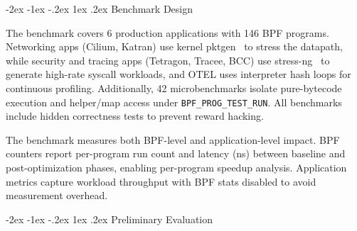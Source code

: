 \documentclass[sigplan,10pt,anonymous,nonacm]{acmart}
\makeatletter
\renewcommand\section{\@startsection{section}{1}{\z@}%
  {-2ex \@plus -1ex \@minus -.2ex}%
  {1ex \@plus .2ex}%
  {\normalfont\Large\bfseries}}
\makeatother
\begin{document}
\section{Benchmark Design}

The benchmark covers 6 production applications with 146 BPF programs.
Networking apps (Cilium, Katran) use kernel pktgen~\cite{pktgen} to stress the datapath, while security and tracing apps (Tetragon, Tracee, BCC) use stress-ng~\cite{stressng} to generate high-rate syscall workloads, and OTEL uses interpreter hash loops for continuous profiling.
Additionally, 42 microbenchmarks isolate pure-bytecode execution and helper/map access under \texttt{BPF\_PROG\_TEST\_RUN}.
All benchmarks include hidden correctness tests to prevent reward hacking.

The benchmark measures both BPF-level and application-level impact.
BPF counters report per-program run count and latency (ns) between baseline and post-optimization phases, enabling per-program speedup analysis.
Application metrics capture workload throughput with BPF stats disabled to avoid measurement overhead.

\section{Preliminary Evaluation}
\end{document}
